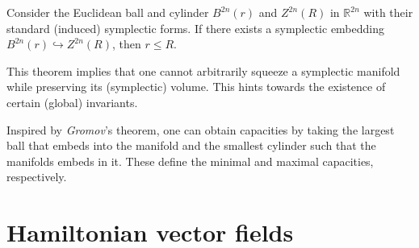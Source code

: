    \begin{theorem}
        Consider the Euclidean ball and cylinder $B^{2n}(r)$ and $Z^{2n}(R)$ in $\mathbb{R}^{2n}$ with their standard (induced) symplectic forms. If there exists a symplectic embedding $B^{2n}(r)\hookrightarrow Z^{2n}(R)$, then $r\leq R$.
    \end{theorem}
    This theorem implies that one cannot arbitrarily squeeze a symplectic manifold while preserving its (symplectic) volume. This hints towards the existence of certain (global) invariants.
    \begin{example}
        Inspired by \textit{Gromov}'s theorem, one can obtain capacities by taking the largest ball that embeds into the manifold and the smallest cylinder such that the manifolds embeds in it. These define the minimal and maximal capacities, respectively.
    \end{example}

\section{Hamiltonian vector fields}\label{section:hamiltonian_vector_fields}


